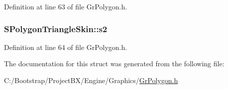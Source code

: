 Definition at line 63 of file GrPolygon.h.\hypertarget{struct_s_polygon_triangle_skin_07085347994b8e5a9772267305b72c19}{
\subsubsection[{s2}]{ {\bf SPolygonTriangleSkin::s2}}}
\label{struct_s_polygon_triangle_skin_07085347994b8e5a9772267305b72c19}




Definition at line 64 of file GrPolygon.h.

The documentation for this struct was generated from the following file:\begin{CompactItemize}
\item 
C:/Bootstrap/ProjectBX/Engine/Graphics/\hyperlink{_gr_polygon_8h}{GrPolygon.h}\end{CompactItemize}
